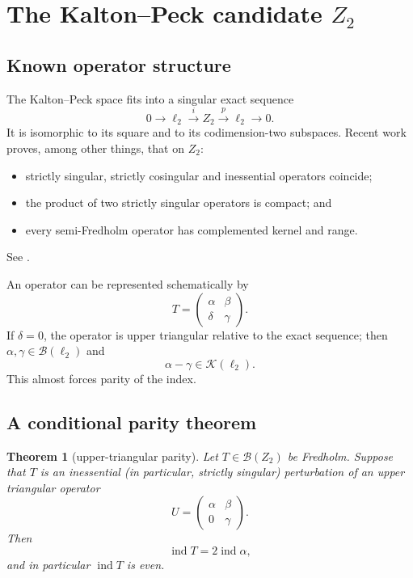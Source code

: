 \documentclass[11pt]{article}
\newtheorem{theorem}{Theorem}[section]
\theoremstyle{definition}
\theoremstyle{remark}
\newcommand{\K}{\mathcal K}
\newcommand{\B}{\mathcal B}
\newcommand{\ind}{\operatorname{ind}}
\begin{document}
\section{The Kalton--Peck candidate $Z_2$}

\subsection{Known operator structure}

The Kalton--Peck space fits into a singular exact sequence
\[
 0\longrightarrow\ell_2\xrightarrow{i}Z_2\xrightarrow{p}\ell_2
 \longrightarrow0.
\]
It is isomorphic to its square and to its codimension-two subspaces.  Recent
work proves, among other things, that on $Z_2$:
\begin{itemize}[leftmargin=1.6em]
\item strictly singular, strictly cosingular and inessential operators coincide;
\item the product of two strictly singular operators is compact; and
\item every semi-Fredholm operator has complemented kernel and range.
\end{itemize}
See \cite{CastilloGonzalezPino2025}.

An operator can be represented schematically by
\[
 T=\begin{pmatrix}\alpha&\beta\\ \delta&\gamma\end{pmatrix}.
\]
If $\delta=0$, the operator is upper triangular relative to the exact sequence;
then $\alpha,\gamma\in\B(\ell_2)$ and
\[
 \alpha-\gamma\in\K(\ell_2).
\]
This almost forces parity of the index.

\subsection{A conditional parity theorem}

\begin{theorem}[upper-triangular parity]\label{thm:z2-parity}
Let $T\in\B(Z_2)$ be Fredholm.  Suppose that $T$ is an inessential (in
particular, strictly singular) perturbation of an upper triangular operator
\[
 U=\begin{pmatrix}\alpha&\beta\\0&\gamma\end{pmatrix}.
\]
Then
\[
 \ind T=2\ind\alpha,
\]
and in particular $\ind T$ is even.
\end{theorem}
\end{document}
